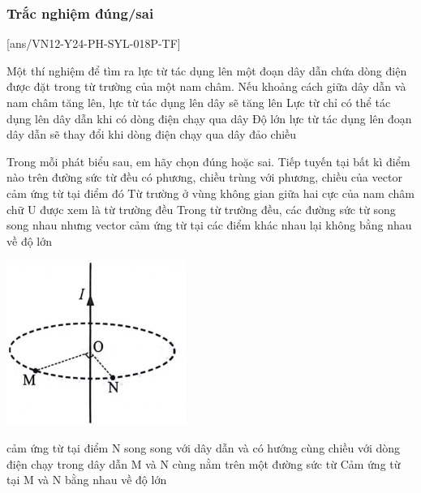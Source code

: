 \subsubsection{Trắc nghiệm đúng/sai}
[ans/VN12-Y24-PH-SYL-018P-TF]
\setcounter{ex}{0}
\begin{ex}
	Một thí nghiệm để tìm ra lực từ tác dụng lên một đoạn dây dẫn chứa dòng điện được đặt trong từ trường của một nam châm.
	{Nếu khoảng cách giữa dây dẫn và nam châm tăng lên, lực từ tác dụng lên dây sẽ tăng lên}
	{\True Lực từ chỉ có thể tác dụng lên dây dẫn khi có dòng điện chạy qua dây}
	{Độ lớn lực từ tác dụng lên đoạn dây dẫn sẽ thay đổi khi dòng điện chạy qua dây đảo chiều}
	\loigiai{}
\end{ex}
\begin{ex}
	Trong mỗi phát biểu sau, em hãy chọn đúng hoặc sai.	
	{\True Tiếp tuyến tại bất kì điểm nào trên đường sức từ đều có phương, chiều trùng với phương, chiều của vector cảm ứng từ tại điểm đó}
	{\True Từ trường ở vùng không gian giữa hai cực của nam châm chữ U được xem là từ trường đều}
	{Trong từ trường đều, các đường sức từ song song nhau nhưng vector cảm ứng từ tại các điểm khác nhau lại không bằng nhau về độ lớn}
	\loigiai{}
\end{ex}
\begin{ex}
	{		\includegraphics[width=0.4\linewidth]{figs/VN12-Y24-PH-SYL-018P-1}
	}
	
	{cảm ứng từ tại điểm N song song với dây dẫn và có hướng cùng chiều với dòng điện chạy trong dây dẫn}
	{\True M và N cùng nằm trên một đường sức từ}
	{\True Cảm ứng từ tại M và N bằng nhau về độ lớn}
	\loigiai{}
\end{ex}

